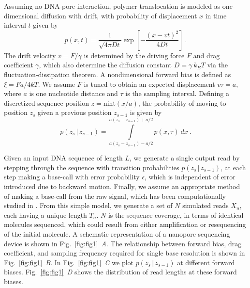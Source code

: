\documentclass{biophys_letter}
\newcommand{\bias}{\beta}
\newcommand{\err}{\epsilon}
\newcommand{\kje}[1]{\textcolor{BurntOrange}{#1}}
\begin{document}
\begin{multicols}{2}
Assuming no DNA-pore interaction, polymer translocation is modeled as one-dimensional diffusion with drift, with probability of displacement $x$ in time interval $t$ given by
\begin{equation}
  p(x, t) 
  =  
  \frac{1}
       {\sqrt{4 \pi D t}}
  \exp 
  \left[ 
    - \frac{(x - v t)^2}
           {4 D t} 
  \right]
  ~.
\end{equation}
The drift velocity $v = F/\gamma$ is determined by the driving force $F$ and drag coefficient $\gamma$, which also determine the diffusion constant $D = \gamma \: k_B T$ via the fluctuation-dissipation theorem.
A nondimensional forward bias is defined as $\xi=Fa/4kT$.
We assume $F$ is tuned to obtain an expected displacement $v \tau = a$, where $a$ is one nucleotide distance and $\tau$ is the sampling interval.
Defining a discretized sequence position $z = \mathrm{nint}(x / a)$, the probability of moving to position $z_s$ given a previous position $z_{s-1}$ is given by
\begin{equation}
\label{eq:gaussian_kernel}
p(z_s \,|\, z_{s-1}) 
=
\int\limits_{a (z_s - z_{s-1}) - a/2}^{a (z_s - z_{s-1}) + a/2}
p(x, \tau) \: dx
~.
\end{equation}



Given an input DNA sequence of length $L$, we generate a single output read by stepping through the sequence with transition probabilities $p(z_s \,|\, z_{s-1}) $, at each step making a base-call with error probability $\err$, which is independent of error introduced due to backward motion.
Finally, we assume an appropriate method of making a base-call from the raw signal, which has been computationally studied in \cite{ODonnell:2013}.
From this simple model, we generate a set of $N$ simulated reads $X_n$, each having a unique length $T_{n}$.
$N$ is the sequence coverage, in terms of identical molecules sequenced, which could result from either amplification or resequencing of the initial molecule.
\kje{
A schematic representation of a nanopore sequencing device is shown in Fig.~\ref{fig:fig1}\emph{~A}.
The relationship between forward bias, drag coefficient, and sampling frequency required for single base resolution is shown in Fig.~\ref{fig:fig1}\emph{~B}.
In Fig.~\ref{fig:fig1}\emph{~C} we plot $p(z_s \,|\, z_{s-1})$ at different forward biases.
Fig.~\ref{fig:fig1}\emph{~D} shows the distribution of read lengths at these forward biases.
}

\end{multicols}
\twocolumn
\end{document}
